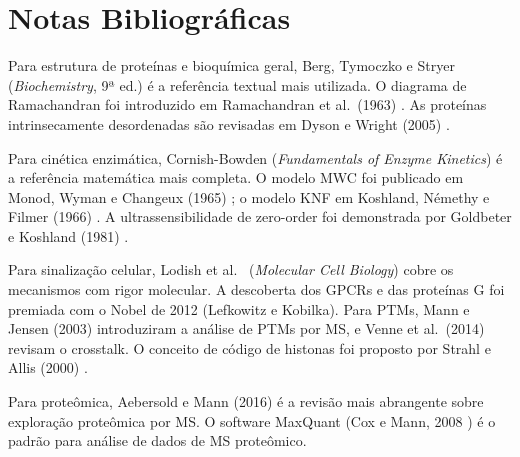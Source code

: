 \section{Notas Bibliográficas}

Para estrutura de proteínas e bioquímica geral, Berg, Tymoczko e Stryer \cite{berg2019}
(\textit{Biochemistry}, 9ª ed.) é a referência textual mais utilizada. O diagrama de
Ramachandran foi introduzido em Ramachandran et al.\ (1963) \cite{ramachandran1963}. As
proteínas intrinsecamente desordenadas são revisadas em Dyson e Wright (2005)
\cite{dyson2005}.

Para cinética enzimática, Cornish-Bowden \cite{cornish2012} (\textit{Fundamentals of
Enzyme Kinetics}) é a referência matemática mais completa. O modelo MWC foi publicado em
Monod, Wyman e Changeux (1965) \cite{mwc1965}; o modelo KNF em Koshland, Némethy e Filmer
(1966) \cite{knf1966}. A ultrassensibilidade de zero-order foi demonstrada por Goldbeter e
Koshland (1981) \cite{goldbeter1981}.

Para sinalização celular, Lodish et al.\ \cite{lodish2021} (\textit{Molecular Cell
Biology}) cobre os mecanismos com rigor molecular. A descoberta dos GPCRs e das proteínas
G foi premiada com o Nobel de 2012 (Lefkowitz e Kobilka). Para PTMs, Mann e Jensen (2003)
\cite{mann2003} introduziram a análise de PTMs por MS, e Venne et al.\ (2014)
\cite{venne2014} revisam o crosstalk. O conceito de código de histonas foi proposto por
Strahl e Allis (2000) \cite{strahl2000}.

Para proteômica, Aebersold e Mann (2016) \cite{aebersold2016} é a revisão mais abrangente
sobre exploração proteômica por MS. O software MaxQuant (Cox e Mann, 2008 \cite{cox2008})
é o padrão para análise de dados de MS proteômico.

